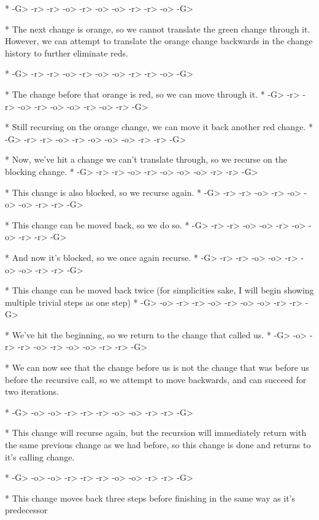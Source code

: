 \documentclass{article}
\begin{document}
      	     	     	       	    	 *
-G> -r> -r> -o> -r> -o> -o> -r> -r> -o> -G>


* The next change is orange, 
so we cannot translate the green change 
through it. 
However, we can attempt 
to translate the orange change 
backwards in the change history 
to further eliminate reds.

      	   	     	     	     *
-G> -r> -r> -o> -r> -o> -o> -r> -r> -o> -G>


* The change before that orange is red, 
so we can move through it.
      	     	    	 	 *
-G> -r> -r> -o> -r> -o> -o> -r> -o> -r> -G>

* Still recursing on the orange change, 
we can move it back another red change.
  		     	     *
-G> -r> -r> -o> -r> -o> -o> -o> -r> -r> -G>

* Now, we've hit a change we can't translate through, 
so we recurse on the blocking change.
       	     	   	 *
-G> -r> -r> -o> -r> -o> -o> -o> -r> -r> -G>

* This change is also blocked, 
so we recurse again.
       	      	     *
-G> -r> -r> -o> -r> -o> -o> -o> -r> -r> -G>

* This change can be moved back, 
so we do so.
       	      	 *
-G> -r> -r> -o> -o> -r> -o> -o> -r> -r> -G>

* And now it's blocked, 
so we once again recurse.
      	     *
-G> -r> -r> -o> -o> -r> -o> -o> -r> -r> -G>

* This change can be moved back twice 
(for simplicities sake, 
I will begin showing multiple trivial steps as one step)
     *
-G> -o> -r> -r> -o> -r> -o> -o> -r> -r> -G>

* We've hit the beginning, 
so we return to the change that called us.
  	    	 *
-G> -o> -r> -r> -o> -r> -o> -o> -r> -r> -G>

* We can now see that the change before us 
is not the change that was before us 
before the recursive call, 
so we attempt to move backwards, 
and can succeed for two iterations.

     	 *
-G> -o> -o> -r> -r> -r> -o> -o> -r> -r> -G>


* This change will recurse again, 
but the recursion will immediately return 
with the same previous change 
as we had before, 
so this change is done 
and returns to it's calling change.

       	      	   	 *
-G> -o> -o> -r> -r> -r> -o> -o> -r> -r> -G>


* This change moves back three steps 
before finishing in the same way as it's predecessor
\end{document}
